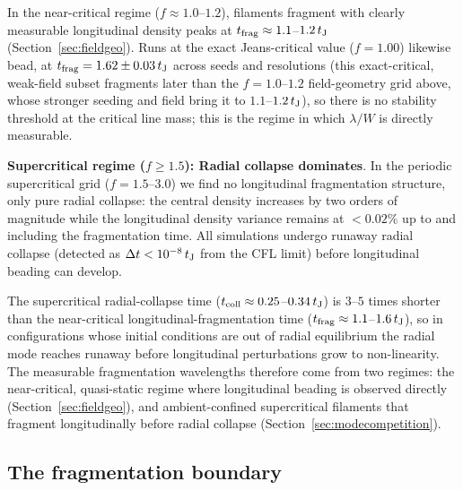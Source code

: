 \documentclass[usenatbib,twoside,twocolumn]{mnras}
\begin{document}
In the near-critical regime ($f\approx1.0$--$1.2$), filaments fragment with clearly measurable longitudinal density peaks at $t_{\rm frag}\approx1.1$--$1.2\,t_{\rm J}$ (Section~\ref{sec:fieldgeo}). Runs at the exact Jeans-critical value ($f=1.00$) likewise bead, at $t_{\rm frag}=1.62\pm0.03\,t_{\rm J}$ across seeds and resolutions (this exact-critical, weak-field subset fragments later than the $f=1.0$--$1.2$ field-geometry grid above, whose stronger seeding and field bring it to $1.1$--$1.2\,t_{\rm J}$), so there is no stability threshold at the critical line mass; this is the regime in which $\lambda/W$ is directly measurable.

\textbf{Supercritical regime ($f \geq 1.5$): Radial collapse dominates}. In the periodic supercritical grid ($f=1.5$--$3.0$) we find no longitudinal fragmentation structure, only pure radial collapse: the central density increases by two orders of magnitude while the longitudinal density variance remains at $<0.02\%$ up to and including the fragmentation time. All simulations undergo runaway radial collapse (detected as $\Delta t < 10^{-8}\,t_{\rm J}$ from the CFL limit) before longitudinal beading can develop.

The supercritical radial-collapse time ($t_{\rm coll}\approx0.25$--$0.34\,t_{\rm J}$) is $3$--$5$ times shorter than the near-critical longitudinal-fragmentation time ($t_{\rm frag}\approx1.1$--$1.6\,t_{\rm J}$), so in configurations whose initial conditions are out of radial equilibrium the radial mode reaches runaway before longitudinal perturbations grow to non-linearity. The measurable fragmentation wavelengths therefore come from two regimes: the near-critical, quasi-static regime where longitudinal beading is observed directly (Section~\ref{sec:fieldgeo}), and ambient-confined supercritical filaments that fragment longitudinally before radial collapse (Section~\ref{sec:modecompetition}).

\subsection{The fragmentation boundary}
\label{sec:dtc}
\end{document}
